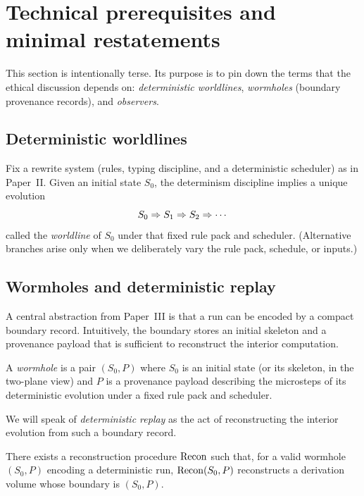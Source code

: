 \documentclass{aion}
\begin{document}
\section{Technical prerequisites and minimal restatements}
\label{sec:background}

This section is intentionally terse.
Its purpose is to pin down the terms that the ethical discussion depends on:
\emph{deterministic worldlines}, \emph{wormholes} (boundary provenance records), and \emph{observers}.

\subsection{Deterministic worldlines}
Fix a \WARP{} rewrite system (rules, typing discipline, and a deterministic scheduler) as in
Paper~II.
Given an initial state $S_0$, the determinism discipline implies a unique evolution
\[
  S_0 \Rightarrow S_1 \Rightarrow S_2 \Rightarrow \cdots
\]
called the \emph{worldline} of $S_0$ under that fixed rule pack and scheduler.
(Alternative branches arise only when we deliberately vary the rule pack, schedule, or inputs.)

\subsection{Wormholes and deterministic replay}
\label{sec:wormholes}

A central abstraction from Paper~III is that a run can be encoded by a compact boundary record.
Intuitively, the boundary stores an initial skeleton and a provenance payload that is sufficient to
reconstruct the interior computation.

\begin{definition}
A \emph{wormhole} is a pair $(S_0,P)$ where $S_0$ is an initial \WARP{} state (or its skeleton, in the
two-plane view) and $P$ is a provenance payload describing the microsteps of its deterministic
evolution under a fixed rule pack and scheduler.
\end{definition}

We will speak of \emph{deterministic replay} as the act of reconstructing the interior evolution
from such a boundary record.

\begin{theorem}
\label{thm:backward}
There exists a reconstruction procedure $\operatorname{Recon}$ such that, for a valid wormhole $(S_0,P)$ encoding a
deterministic run, $\operatorname{Recon}(S_0,P)$ reconstructs a derivation volume whose boundary is $(S_0,P)$.
\end{theorem}
\end{document}
